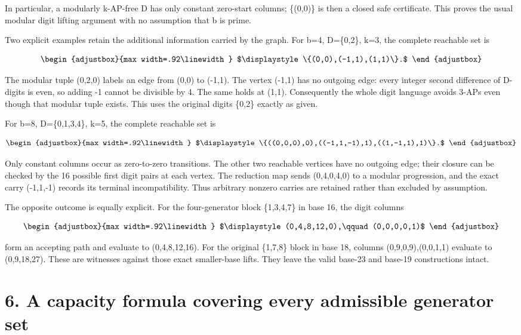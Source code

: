In particular, a modularly k-AP-free D has only constant zero-start columns; \{(0,0)\} is then a closed safe certificate. This proves the usual modular digit lifting argument with no assumption that b is prime.

Two explicit examples retain the additional information carried by the graph. For b=4, D=\{0,2\}, k=3, the complete reachable set is

\[
\begin{adjustbox}{max width=.92\linewidth}
$\displaystyle \{(0,0),(-1,1),(1,1)\}.$
\end{adjustbox}
\]

The modular tuple (0,2,0) labels an edge from (0,0) to (-1,1). The vertex (-1,1) has no outgoing edge: every integer second difference of D-digits is even, so adding -1 cannot be divisible by 4. The same holds at (1,1). Consequently the whole digit language avoids 3-APs even though that modular tuple exists. This uses the original digits \{0,2\} exactly as given.

For b=8, D=\{0,1,3,4\}, k=5, the complete reachable set is

\[
\begin{adjustbox}{max width=.92\linewidth}
$\displaystyle \{((0,0,0),0),((-1,1,-1),1),((1,-1,1),1)\}.$
\end{adjustbox}
\]

Only constant columns occur as zero-to-zero transitions. The other two reachable vertices have no outgoing edge; their closure can be checked by the 16 possible first digit pairs at each vertex. The reduction map sends (0,4,0,4,0) to a modular progression, and the exact carry (-1,1,-1) records its terminal incompatibility. Thus arbitrary nonzero carries are retained rather than excluded by assumption.

The opposite outcome is equally explicit. For the four-generator block \{1,3,4,7\} in base 16, the digit columns

\[
\begin{adjustbox}{max width=.92\linewidth}
$\displaystyle (0,4,8,12,0),\qquad(0,0,0,0,1)$
\end{adjustbox}
\]

form an accepting path and evaluate to (0,4,8,12,16). For the original \{1,7,8\} block in base 18, columns (0,9,0,9),(0,0,1,1) evaluate to (0,9,18,27). These are witnesses against those exact smaller-base lifts. They leave the valid base-23 and base-19 constructions intact.

\section{6. A capacity formula covering every admissible generator set}\label{n03-a-capacity-formula-covering-every-admissible-generator-set}

